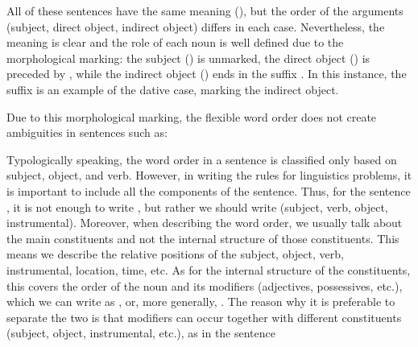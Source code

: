 \begin{refsection}
\begin{center}


\end{center}

All of these sentences have the same meaning (), but the order of the arguments (subject, direct object, indirect object) differs in each case. Nevertheless, the meaning is clear and the role of each noun is well defined due to the morphological marking: the subject () is unmarked, the direct object () is preceded by , while the indirect object () ends in the suffix . In this instance, the suffix  is an example of the dative case, marking the indirect object.

Due to this morphological marking, the flexible word order does not create ambiguities in sentences such as:

\begin{center}


\end{center}

Typologically speaking, the word order in a sentence is classified only based on subject, object, and verb. However, in writing the rules for linguistics problems, it is important to include all the components of the sentence. Thus, for the sentence , it is not enough to write , but rather we should write  (subject, verb, object, instrumental). Moreover, when describing the word order, we usually talk about the main constituents and not the internal structure of those constituents. This means we describe the relative positions of the subject, object, verb, instrumental, location, time, etc.
As for the internal structure of the constituents, this covers the order of the noun and its modifiers (adjectives, possessives, etc.), which we can write as {}, or, more generally, . The reason why it is preferable to separate the two is that modifiers can occur together with different constituents (subject, object, instrumental, etc.), as in the sentence 


\end{refsection}
